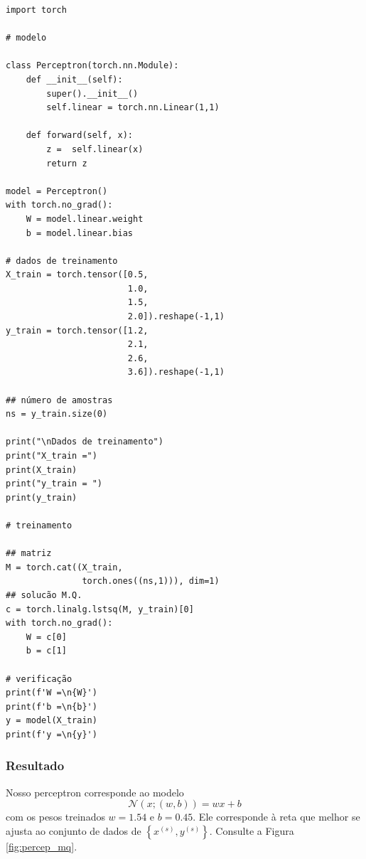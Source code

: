 \begin{lstlisting}[caption=perceptron\_mq.py, label=cap_perceptron_sec_unit:cod:perceptron_mq]
import torch

# modelo

class Perceptron(torch.nn.Module):
    def __init__(self):
        super().__init__()
        self.linear = torch.nn.Linear(1,1)

    def forward(self, x):
        z =  self.linear(x)
        return z

model = Perceptron()
with torch.no_grad():
    W = model.linear.weight
    b = model.linear.bias

# dados de treinamento
X_train = torch.tensor([0.5,
                        1.0,
                        1.5,
                        2.0]).reshape(-1,1)
y_train = torch.tensor([1.2,
                        2.1,
                        2.6,
                        3.6]).reshape(-1,1)

## número de amostras
ns = y_train.size(0)

print("\nDados de treinamento")
print("X_train =")
print(X_train)
print("y_train = ")
print(y_train)

# treinamento

## matriz
M = torch.cat((X_train,
               torch.ones((ns,1))), dim=1)
## solucão M.Q.
c = torch.linalg.lstsq(M, y_train)[0]
with torch.no_grad():
    W = c[0]
    b = c[1]

# verificação
print(f'W =\n{W}')
print(f'b =\n{b}')
y = model(X_train)
print(f'y =\n{y}')
\end{lstlisting}

\subsubsection{Resultado}

Nosso perceptron corresponde ao modelo
\begin{equation}
  \mathcal{N}(x; (w,b)) = wx + b
\end{equation}
com os pesos treinados $w = 1.54$ e $b = 0.45$. Ele corresponde à reta que melhor se ajusta ao conjunto de dados de $\left\{x^{(s)}, y^{(s)}\right\}$. Consulte a Figura \ref{fig:percep_mq}.

